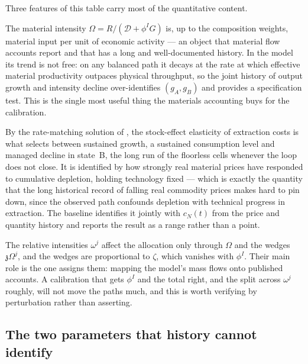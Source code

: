 Three features of this table carry most of the quantitative content.

 The material intensity $\Omega=R/\left(\mathcal D+\phi^IG\right)$ is, up to the composition weights, material input per unit of economic activity --- an object that material flow accounts report and that has a long and well-documented history. In the model its trend is not free: on any balanced path it decays at the rate at which effective material productivity outpaces physical throughput, so the joint history of output growth and intensity decline over-identifies $\left(g_A,g_B\right)$ and provides a specification test. This is the single most useful thing the materials accounting buys for the calibration.

 By the rate-matching solution of , the stock-effect elasticity of extraction costs is what selects between sustained growth, a sustained consumption level and managed decline in state~B, the long run of the floorless cells whenever the loop does not close. It is identified by how strongly real material prices have responded to cumulative depletion, holding technology fixed --- which is exactly the quantity that the long historical record of falling real commodity prices makes hard to pin down, since the observed path confounds depletion with technical progress in extraction. The baseline identifies it jointly with $c_N(t)$ from the price and quantity history and reports the result as a range rather than a point.

 The relative intensities $\omega^j$ affect the allocation only through $\Omega$ and the wedges $\mathfrak z\Omega^j$, and the wedges are proportional to $\zeta$, which vanishes with $\phi^I$. Their main role is the one  assigns them: mapping the model's mass flows onto published accounts. A calibration that gets $\phi^I$ and the total right, and the split across $\omega^j$ roughly, will not move the paths much, and this is worth verifying by perturbation rather than asserting.

\subsection{The two parameters that history cannot identify}\label{sec:q:cal:hard}

